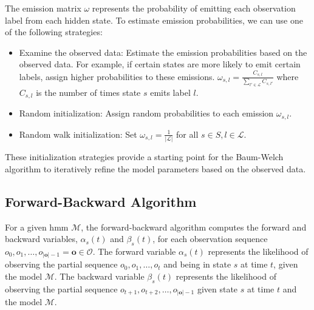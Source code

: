 The emission matrix $\omega$ represents the probability of emitting each observation label from each hidden state. 
To estimate emission probabilities, we can use one of the following strategies:
\begin{itemize}
    \item Examine the observed data: Estimate the emission probabilities based on the observed data. For example, if certain states are more likely to emit certain labels, assign higher probabilities to these emissions. 
    $\omega_{s, l} = \frac{C_{s, l}}{\sum_{l' \in \mathcal{L}} C_{s, l'}}$ where $C_{s, l}$ is the number of times state $s$ emits label $l$.
    \item Random initialization: Assign random probabilities to each emission $\omega_{s, l}$.
    \item Random walk initialization: Set $\omega_{s, l} = \frac{1}{|\mathcal{L}|}$ for all $s \in S, l \in \mathcal{L}$.
\end{itemize}

These initialization strategies provide a starting point for the Baum-Welch algorithm to iteratively refine the model parameters based on the observed data.

\subsection{Forward-Backward Algorithm}\label{subsec:forward-backwards_algorithm}
For a given \gls{hmm} $\mathcal{M}$, the forward-backward algorithm computes the forward and backward variables, $\alpha_s(t)$ and $\beta_s(t)$, for each observation sequence $o_0, o_1, \dots, o_{|\mathbf{o}|-1} = \mathbf{o} \in \mathcal{O}$.
The forward variable $\alpha_s(t)$ represents the likelihood of observing the partial sequence $o_0, o_1, \dots, o_t$ and being in state $s$ at time $t$, given the model $\mathcal{M}$.
The backward variable $\beta_s(t)$ represents the likelihood of observing the partial sequence $o_{t+1}, o_{t+2}, \dots, o_{|\mathbf{o}|-1}$ given state $s$ at time $t$ and the model $\mathcal{M}$.





